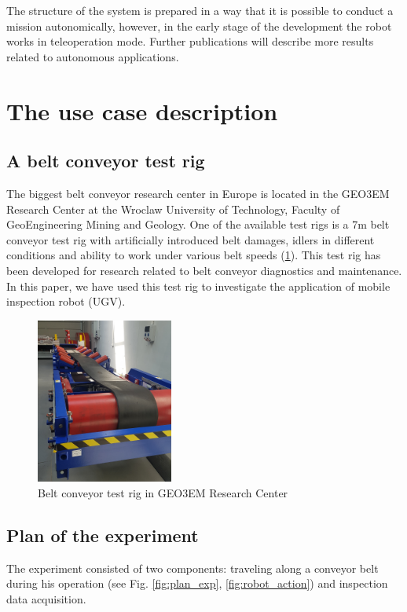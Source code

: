 \documentclass[3p,times,12pt]{elsarticle}
\begin{document}
The structure of the system is prepared in a way that it is possible to conduct a mission autonomically, however, in the early stage of the development the robot works in teleoperation mode. Further publications will describe more results related to autonomous applications.

\newpage
\section{The use case description}\label{meth} 


\subsection{A belt conveyor test rig}

The biggest belt conveyor research center in Europe is located in the GEO3EM Research Center at the Wroclaw University of Technology, Faculty of GeoEngineering Mining and Geology. One of the available test rigs is a 7m belt conveyor test rig with artificially introduced belt damages, idlers in different conditions and ability to work under various belt speeds (\ref{beltconveyor}). This test rig has been developed for research related to belt conveyor diagnostics and maintenance. In this paper, we have used this test rig to investigate the application of mobile inspection robot (UGV).


\begin{figure}[ht!]
	\centering
	\includegraphics[width=0.4\textwidth, height=0.6\textwidth]{beltconveyor.jpg}
	\caption{Belt conveyor test rig in GEO3EM Research Center}
	\label{beltconveyor}
\end{figure}


\subsection{Plan of the experiment}
The experiment consisted of two components: traveling along a conveyor belt during his operation (see Fig. \ref{fig:plan_exp}, \ref{fig:robot_action}) and inspection data acquisition. 
\end{document}
